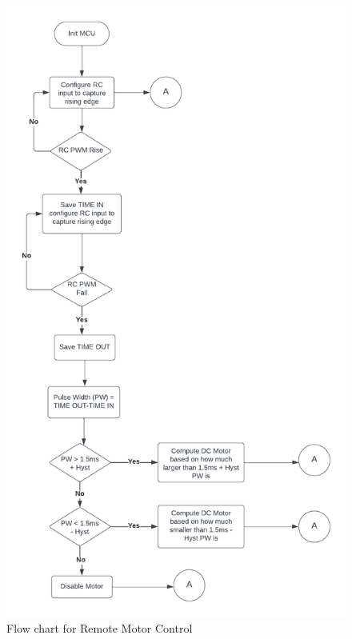 \begin{figure}[htbp]
\includegraphics[scale=0.8]{Figures/Blank_diagram.png}
\centering
\caption[Flow chart for Remote Motor Control] {Flow chart for Remote Motor Control}
\label{fig:remotecontrol}
\end{figure}
